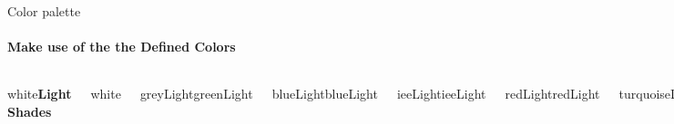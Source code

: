 \documentclass[aspectratio=169]{beamer}
\begin{document}
\begin{frame}{Color palette}
    \framesubtitle{Make use of the the Defined Colors}
    \vspace{1cm}
    \begin{columns}[t]
            \begin{beamercolorbox}[center,colsep*=4pt]{white}\textbf{Light Shades}\strut\end{beamercolorbox}
            \begin{beamercolorbox}[center,colsep*=4pt]{white}\strut\end{beamercolorbox}
            \begin{beamercolorbox}[center,colsep*=4pt]{greyLight}greenLight\strut\end{beamercolorbox}
            \begin{beamercolorbox}[center,colsep*=4pt]{blueLight}blueLight\strut\end{beamercolorbox}
            \begin{beamercolorbox}[center,colsep*=4pt]{ieeLight}ieeLight\strut\end{beamercolorbox}
            \begin{beamercolorbox}[center,colsep*=4pt]{redLight}redLight\strut\end{beamercolorbox}
            \begin{beamercolorbox}[center,colsep*=4pt]{turquoiseLight}turquoiseLight\strut\end{beamercolorbox}
            \begin{beamercolorbox}[center,colsep*=4pt]{greenLight}greenLight\strut\end{beamercolorbox}
            \begin{beamercolorbox}[center,colsep*=4pt]{yellowLight}yellowLight\strut\end{beamercolorbox}
            \begin{beamercolorbox}[center,colsep*=4pt]{white}\textbf{Standard}\strut\end{beamercolorbox}
            \begin{beamercolorbox}[center,colsep*=4pt]{white}\strut\end{beamercolorbox}
            \begin{beamercolorbox}[center,colsep*=4pt]{grey}grey\strut\end{beamercolorbox}
            \begin{beamercolorbox}[center,colsep*=4pt]{blue}blue\strut\end{beamercolorbox}

\end{columns}
\end{frame}
\end{document}
